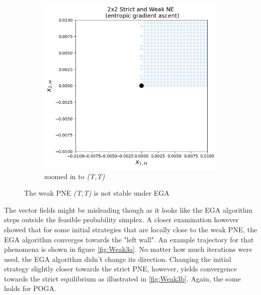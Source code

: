 \begin{figure}[H]
\begin{subfigure}{.52\textwidth}
    \includegraphics[width=\textwidth]{logos/Weak4.png}
    \caption{zoomed in to \textit{(T,T)}}
    \label{fig:Weak2b}
\end{subfigure}
\caption{The weak PNE \textit{(T,T)} is not stable under EGA}
\label{fig:2x2Weak2}
\end{figure}

The vector fields might be misleading though as it looks like the EGA algorithm steps outside the feasible probability simplex. A closer examination however showed that for some initial strategies that are locally close to the weak PNE, the EGA algorithm converges towards the "left wall". An example trajectory for that phenomena is shown in figure \ref{fig:Weak3a}. No matter how much iterations were used, the EGA algorithm didn't change its direction. Changing the initial strategy slightly closer towards the strict PNE, however, yields convergence towards the strict equilibrium as illustrated in \ref{fig:Weak3b}. Again, the some holds for POGA.


